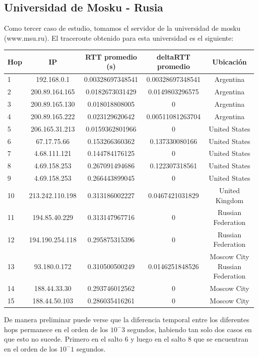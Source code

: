  \subsection{Universidad de Mosku - Rusia}

Como tercer caso de estudio, tomamos el servidor de la universidad de mosku (www.msu.ru). El traceroute obtenido para esta universidad es el siguiente:

\bigskip

\begin{tabular}{| l | c | c | c | c |}
 \hline 
Hop & IP &  RTT promedio (s)  & deltaRTT promedio & Ubicación\\
\hline 
1  &  192.168.0.1  &  0.00328697348541    &  0.00328697348541 & Argentina\\
\hline 
2  &  200.89.164.165  &  0.0182673031429    &  0.0149803296575 & Argentina\\
\hline 
3  &  200.89.165.130  &  0.018018808005    &  0 & Argentina\\
\hline 
4  &  200.89.165.222  &  0.023129620642   &  0.00511081263704 & Argentina\\
\hline 
5  &  206.165.31.213  &  0.0159362801966    &  0 & United States\\ 
\hline 
6  &  67.17.75.66  &  0.153266360362    &  0.137330080166 &  United States\\
\hline 
7  &  4.68.111.121  &  0.144784176125    &  0 & United States\\ 
\hline 
8  &  4.69.158.253  &  0.267091494686    &  0.122307318561 &  United States\\
\hline 
9  &  4.69.158.253  &  0.266443899045    &  0 & United States\\
\hline 
10  &  213.242.110.198  &  0.313186002227    &  0.0467421031829 & United Kingdom\\
\hline 
11  &  194.85.40.229  &  0.313147967716    &  0 & Russian Federation\\
\hline 
12  &  194.190.254.118  &  0.295875315396    &  0 & Russian Federation\\
\hline 
13  &  93.180.0.172  &  0.310500500249   &  0.0146251848526 & Moscow City Russian Federation\\
\hline 
14  &  188.44.33.30  &  0.293746012562    &  0 & Moscow City\\
\hline 
15  &  188.44.50.103  &  0.286035416261   &  0 & Moscow City\\
\hline 
\end{tabular}

De manera preliminar puede verse que la diferencia temporal entre los diferentes hops permanece en el orden de los $10^-3$ segundos, 
habiendo tan solo dos casos en que esto no sucede. Primero en el salto $6$ y luego en el salto $8$ que se encuentran en el orden de los $10^-1$ 
segundos.

